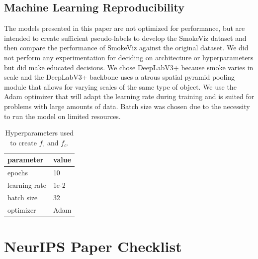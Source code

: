 \documentclass{article}
\begin{document}
\subsection{Machine Learning Reproducibility}

The models presented in this paper are not optimized for performance, but are intended to create sufficient pseudo-labels to develop the SmokeViz dataset and then compare the performance of SmokeViz against the original dataset. We did not perform any experimentation for deciding on architecture or hyperparameters but did make educated decisions. We chose DeepLabV3+ because smoke varies in scale and the DeepLabV3+ backbone uses a atrous spatial pyramid pooling module that allows for varying scales of the same type of object. We use the Adam optimizer that will adapt the learning rate during training and is suited for problems with large amounts of data. Batch size was chosen due to the necessity to run the model on limited resources. 

\begin{table}
    \caption{Hyperparameters used to create \(f_{\circ}\) and \(f_{c}\).}
  \label{hyper}
  \centering
  \begin{tabular}{ll}
    \toprule
    parameter & value \\ 
    \midrule
    epochs & 10 \\
    learning rate & 1e-2 \\
    batch size & 32 \\
    optimizer & Adam \\
    \bottomrule
  \end{tabular}
\end{table}





\newpage
\section*{NeurIPS Paper Checklist}
\end{document}
